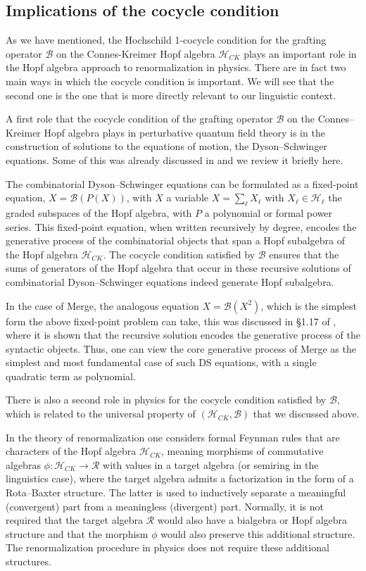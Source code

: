 \documentclass[12pt]{amsart}
\numberwithin{equation}{section}
\def\cB{{\mathcal B}}
\def\cH{{\mathcal H}}
\def\cR{{\mathcal R}}
\begin{document}
\smallskip
\subsection{Implications of the cocycle condition}\label{implcocycleSec}

As we have mentioned, the Hochschild 1-cocycle condition for the
grafting operator $\cB$ on the Connes-Kreimer Hopf algebra $\cH_{CK}$ plays an
important role in the Hopf algebra approach to renormalization in physics. 
There are in fact two main ways in which the cocycle condition is important. 
We will see that the second one is the one that is more directly relevant to 
our linguistic context.

A first role that the cocycle condition of the grafting operator $\cB$ on the Connes--Kreimer
Hopf algebra plays in perturbative quantum field theory is in the construction of
solutions to the equations of motion, the Dyson--Schwinger equations. Some of this 
was already discussed in \cite{MCB} and we review it briefly here. 

The combinatorial Dyson--Schwinger equations can be formulated as 
a fixed-point equation, $X=\cB(P(X))$, with $X$ a variable $X=\sum_\ell X_\ell$
with $X_\ell\in \cH_\ell$ the graded subspaces of the Hopf algebra, with $P$
a polynomial or formal power series. This fixed-point equation, when written
recursively by degree, encodes the generative process of the combinatorial
objects that span a Hopf subalgebra of the Hopf algebra $\cH_{CK}$. The
cocycle condition satisfied by $\cB$ ensures that the sums of generators 
of the Hopf algebra that occur in these recursive solutions of 
combinatorial Dyson--Schwinger equations indeed generate Hopf subalgebra.

In the case of Merge, the analogous equation $X=\cB(X^2)$, which is the
simplest form the above fixed-point problem can take, this was
discussed in \S 1.17 of \cite{MCB}, where it is shown that the recursive
solution encodes the generative process of the syntactic objects. Thus,
one can view the core generative process
of Merge as the simplest and most fundamental case of
such DS equations, with a single quadratic term as polynomial. 

There is also a second role in physics for the cocycle condition satisfied by $\cB$,
which is related to the universal property of $(\cH_{CK}, \cB)$ that we discussed above.

In the theory of renormalization one considers formal Feynman rules that are
characters of the Hopf algebra $\cH_{CK}$, meaning morphisms of commutative
algebras $\phi: \cH_{CK} \to \cR$ with values in a target algebra (or semiring in the
linguistics case), where the target algebra admits a factorization in the form 
of a Rota--Baxter structure. The latter is used to inductively separate a meaningful
(convergent) part from a meaningless (divergent) part. Normally, it is not required that
the target algebra $\cR$ would also have a bialgebra or Hopf algebra structure and that
the morphism $\phi$ would also preserve this additional structure. The renormalization
procedure in physics does not require these additional structures.
\end{document}
